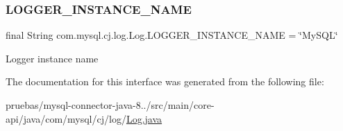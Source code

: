\subsubsection{\texorpdfstring{L\+O\+G\+G\+E\+R\+\_\+\+I\+N\+S\+T\+A\+N\+C\+E\+\_\+\+N\+A\+ME}{LOGGER\_INSTANCE\_NAME}}
{\footnotesize\ttfamily final String com.\+mysql.\+cj.\+log.\+Log.\+L\+O\+G\+G\+E\+R\+\_\+\+I\+N\+S\+T\+A\+N\+C\+E\+\_\+\+N\+A\+ME = \char`\"{}My\+S\+QL\char`\"{}\hspace{0.3cm}{\ttfamily [static]}}

Logger instance name 

The documentation for this interface was generated from the following file\+:\begin{DoxyCompactItemize}
\item 
pruebas/mysql-\/connector-\/java-\/8../src/main/core-\/api/java/com/mysql/cj/log/\mbox{\hyperlink{_log_8java}{Log.\+java}}\end{DoxyCompactItemize}
